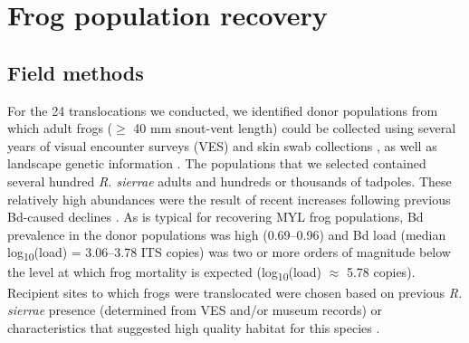 \documentclass[9pt,twocolumn,twoside,lineno]{pnas-new}
\begin{document}
{{\section*{Frog population recovery}\label{frog-population-recovery-1}}

\hypertarget{field-methods}{%
\subsection*{Field methods}\label{field-methods}}

For the 24 translocations we conducted, we identified donor populations
from which adult frogs (\(\geq\) 40 mm snout-vent length) could be
collected using several years of visual encounter surveys (VES) and skin
swab collections \citep{knapp2016}, as well as landscape genetic
information \citep{poorten2017}. The populations that we selected
contained several hundred \emph{R. sierrae} adults and hundreds or
thousands of tadpoles. These relatively high abundances were the result
of recent increases following previous Bd-caused declines
\citep{knapp2016}. As is typical for recovering MYL frog populations, Bd
prevalence in the donor populations was high (0.69--0.96) and Bd load
(median log\textsubscript{10}(load) = 3.06--3.78 ITS copies) was two or
more orders of magnitude below the level at which frog mortality is
expected (log\textsubscript{10}(load) \(\approx\) 5.78
copies)\citep{vredenburg2010, joseph2018}. Recipient sites to which
frogs were translocated were chosen based on previous \emph{R. sierrae}
presence (determined from VES and/or museum records) or characteristics
that suggested high quality habitat for this species \citep{knapp2005}.

}
\end{document}
